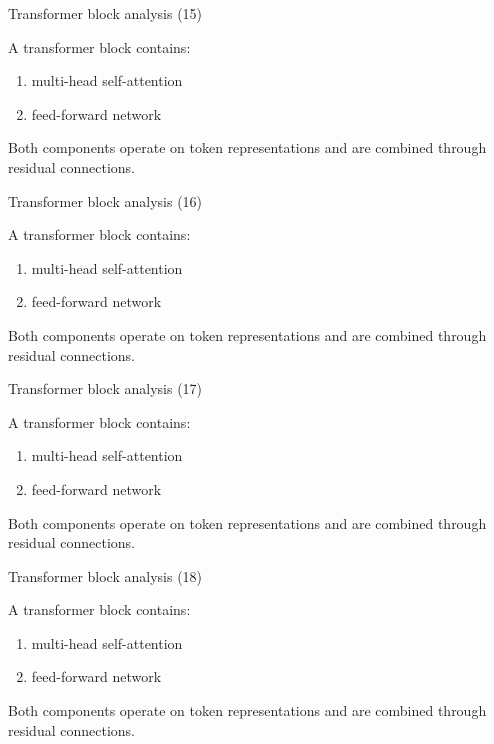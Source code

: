 \documentclass[aspectratio=169]{beamer}
\begin{document}
\begin{frame}{Transformer block analysis (15)}

A transformer block contains:

\begin{enumerate}
\item multi-head self-attention
\item feed-forward network
\end{enumerate}

Both components operate on token representations and are
combined through residual connections.

\end{frame}


\begin{frame}{Transformer block analysis (16)}

A transformer block contains:

\begin{enumerate}
\item multi-head self-attention
\item feed-forward network
\end{enumerate}

Both components operate on token representations and are
combined through residual connections.

\end{frame}


\begin{frame}{Transformer block analysis (17)}

A transformer block contains:

\begin{enumerate}
\item multi-head self-attention
\item feed-forward network
\end{enumerate}

Both components operate on token representations and are
combined through residual connections.

\end{frame}


\begin{frame}{Transformer block analysis (18)}

A transformer block contains:

\begin{enumerate}
\item multi-head self-attention
\item feed-forward network
\end{enumerate}

Both components operate on token representations and are
combined through residual connections.

\end{frame}
\end{document}
